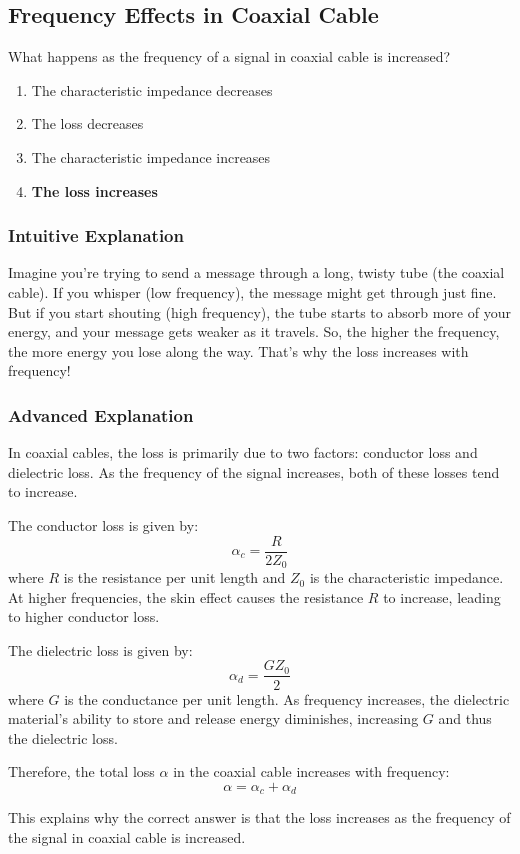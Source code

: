 \subsection{Frequency Effects in Coaxial Cable}
\label{T9B05}

\begin{tcolorbox}[colback=gray!10!white,colframe=black!75!black,title=T9B05]
What happens as the frequency of a signal in coaxial cable is increased?
\begin{enumerate}[label=\Alph*]
    \item The characteristic impedance decreases
    \item The loss decreases
    \item The characteristic impedance increases
    \item \textbf{The loss increases}
\end{enumerate}
\end{tcolorbox}

\subsubsection{Intuitive Explanation}
Imagine you're trying to send a message through a long, twisty tube (the coaxial cable). If you whisper (low frequency), the message might get through just fine. But if you start shouting (high frequency), the tube starts to absorb more of your energy, and your message gets weaker as it travels. So, the higher the frequency, the more energy you lose along the way. That's why the loss increases with frequency!

\subsubsection{Advanced Explanation}
In coaxial cables, the loss is primarily due to two factors: conductor loss and dielectric loss. As the frequency of the signal increases, both of these losses tend to increase. 

The conductor loss is given by:
\[
\alpha_c = \frac{R}{2Z_0}
\]
where \( R \) is the resistance per unit length and \( Z_0 \) is the characteristic impedance. At higher frequencies, the skin effect causes the resistance \( R \) to increase, leading to higher conductor loss.

The dielectric loss is given by:
\[
\alpha_d = \frac{G Z_0}{2}
\]
where \( G \) is the conductance per unit length. As frequency increases, the dielectric material's ability to store and release energy diminishes, increasing \( G \) and thus the dielectric loss.

Therefore, the total loss \( \alpha \) in the coaxial cable increases with frequency:
\[
\alpha = \alpha_c + \alpha_d
\]

This explains why the correct answer is that the loss increases as the frequency of the signal in coaxial cable is increased.

